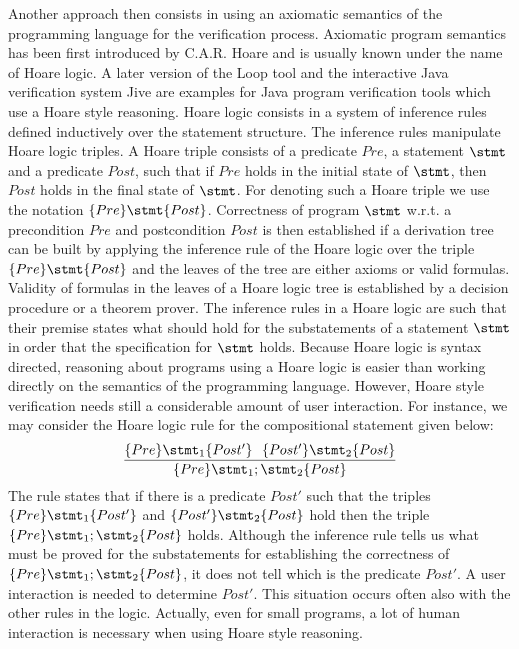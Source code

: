 Another approach then consists in using an axiomatic semantics of the programming language for the verification process. 
Axiomatic program semantics has been first introduced by C.A.R. Hoare  \cite{Hoare69ABC} and is usually known under the name of Hoare 
logic. A later version of the Loop tool  \cite{jacobs03java} 
and the interactive Java verification system Jive \cite{MH00Arc} are examples for  Java program verification tools which use  a Hoare style reasoning.   
 Hoare logic consists in a system of inference rules defined inductively over the statement structure. The inference rules manipulate
  Hoare logic triples. A Hoare triple consists of a predicate $Pre$, a statement $\stmt$ and a predicate $Post$,  such 
that if $Pre$  holds in the initial state of $\stmt$,  then  $Post$  holds in the final state of $\stmt$. For denoting such 
a Hoare  triple we use the  notation $\{Pre \}  \stmt \{Post\}$.
Correctness of program $\stmt$ w.r.t. a precondition $Pre$ and postcondition   $Post$ is then established if a  derivation tree can be built  by applying the inference rule of the Hoare
logic over the triple $\{Pre \}  \stmt \{Post\}$ and the  leaves of the tree are either axioms or valid formulas.
 Validity of formulas in the leaves of a Hoare logic tree is
established by a decision procedure or a theorem prover. 
The inference rules in a Hoare logic are  such that their premise states what should hold for the substatements of a statement $\stmt$ in order that the specification for 
$\stmt$  holds. Because Hoare logic is   syntax directed, reasoning about programs using a Hoare logic is easier than working directly on the
 semantics of the programming language. However, Hoare style verification needs still a considerable amount of user interaction.
For instance, we may consider the Hoare  logic rule for the compositional statement given below:
$$\frac{ \{Pre \}  \stmt_1 \{Post'\} \  \ \{Post'\}  \stmt_2 \{Post\}  }{ \{Pre \}  \stmt_1;\stmt_2 \{Post\} }$$
The rule states that if there is a predicate $Post'$ such that the triples  $\{Pre \}  \stmt_1 \{Post'\}$ and $\{Post'\}  \stmt_2 \{Post\} $ hold then the triple
$\{Pre \}  \stmt_1;\stmt_2 \{Post\} $ holds. 
Although the inference rule tells us what must be proved for the substatements for establishing the correctness of $\{Pre \}  \stmt_1;\stmt_2 \{Post\} $,
 it does not tell which is the predicate $Post'$.
A user interaction is needed to determine  $Post'$. This situation occurs often also with the other rules in the logic.
Actually,  even for small programs, a lot of human interaction  is necessary when  using Hoare style reasoning.
  
